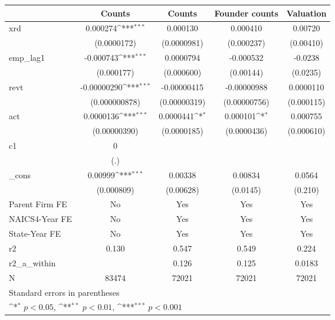 {
\def\sym#1{\ifmmode^{#1}\else\(^{#1}\)\fi}
\begin{tabular}{l*{4}{c}}
\hline\hline
            &\multicolumn{1}{c}{Counts}&\multicolumn{1}{c}{Counts}&\multicolumn{1}{c}{Founder counts}&\multicolumn{1}{c}{Valuation}\\
\hline
xrd         &    0.000274\sym{***}&    0.000130         &    0.000410         &     0.00720         \\
            & (0.0000172)         & (0.0000981)         &  (0.000237)         &   (0.00410)         \\
[1em]
emp\_lag1    &   -0.000743\sym{***}&   0.0000794         &   -0.000532         &     -0.0238         \\
            &  (0.000177)         &  (0.000600)         &   (0.00144)         &    (0.0235)         \\
[1em]
revt        & -0.00000290\sym{***}& -0.00000415         & -0.00000988         &   0.0000110         \\
            &(0.000000878)         &(0.00000319)         &(0.00000756)         &  (0.000115)         \\
[1em]
act         &   0.0000136\sym{***}&   0.0000441\sym{*}  &    0.000101\sym{*}  &    0.000755         \\
            &(0.00000390)         & (0.0000185)         & (0.0000436)         &  (0.000610)         \\
[1em]
c1          &           0         &                     &                     &                     \\
            &         (.)         &                     &                     &                     \\
[1em]
\_cons      &     0.00999\sym{***}&     0.00338         &     0.00834         &      0.0564         \\
            &  (0.000809)         &   (0.00628)         &    (0.0145)         &     (0.210)         \\
[1em]
Parent Firm FE&          No         &         Yes         &         Yes         &         Yes         \\
[1em]
NAICS4-Year FE&          No         &         Yes         &         Yes         &         Yes         \\
[1em]
State-Year FE&          No         &         Yes         &         Yes         &         Yes         \\
\hline
r2          &       0.130         &       0.547         &       0.549         &       0.224         \\
r2\_a\_within &                     &       0.126         &       0.125         &      0.0183         \\
N           &       83474         &       72021         &       72021         &       72021         \\
\hline\hline
\multicolumn{5}{l}{\footnotesize Standard errors in parentheses}\\
\multicolumn{5}{l}{\footnotesize \sym{*} \(p<0.05\), \sym{**} \(p<0.01\), \sym{***} \(p<0.001\)}\\
\end{tabular}
}
